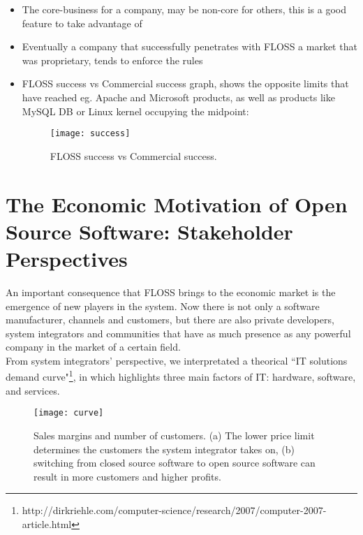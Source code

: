 \begin{itemize}
\item The core-business for a company, may be non-core for others, this is a good feature to take advantage of
\item Eventually a company that successfully penetrates with FLOSS a market that was proprietary, tends to enforce the rules
\item FLOSS success vs Commercial success graph, shows the opposite limits that have reached eg. Apache and Microsoft products, as well as products like MySQL DB or Linux kernel occupying the midpoint:
\begin{figure}[h]
\begin{center}
\texttt{[image: success]}
\caption{FLOSS success vs Commercial success.}
\label{fig:success}
\end{center}
\end{figure}
\end{itemize}


\section{The Economic Motivation of Open Source Software: Stakeholder Perspectives}\label{Section 2.2}

An important consequence that FLOSS brings to the economic market is the emergence of new players in the system. Now there is not only a software manufacturer, channels and customers, but there are also private developers, system integrators and communities that have as much presence as any powerful company in the market of a certain field.\\

From system integrators' perspective, we interpretated a theorical \textquotedblleft IT solutions demand curve"\footnote{http://dirkriehle.com/computer-science/research/2007/computer-2007-article.html}, in which highlights three main factors of IT: hardware, software, and services.\\

\begin{figure}[h]
\begin{center}
\texttt{[image: curve]}
\caption{Sales margins and number of customers. (a) The lower price limit determines the customers the system integrator takes on, (b) switching from closed source software to open source software can result in more customers and higher profits.}
\label{fig:curve}
\end{center}
\end{figure}


